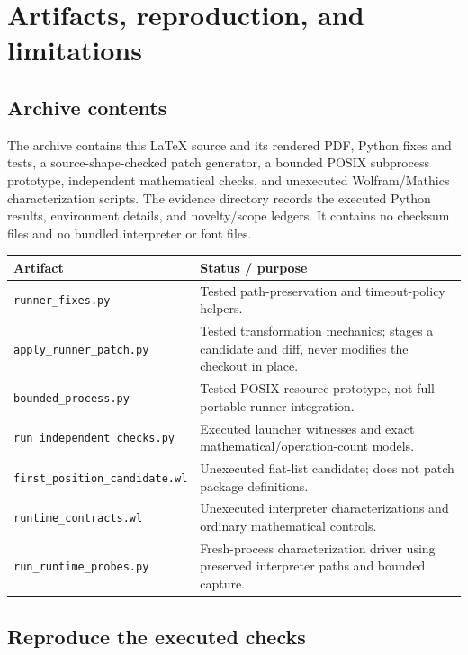 \documentclass[11pt,letterpaper]{article}
\newcommand{\file}[1]{\nolinkurl{#1}}
\begin{document}
\section{Artifacts, reproduction, and limitations}
\label{sec:artifacts}

\subsection{Archive contents}

The archive contains this LaTeX source and its rendered PDF, Python fixes and tests, a source-shape-checked patch generator, a bounded POSIX subprocess prototype, independent mathematical checks, and unexecuted Wolfram/Mathics characterization scripts. The evidence directory records the executed Python results, environment details, and novelty/scope ledgers. It contains no checksum files and no bundled interpreter or font files.

\begin{center}\small
\begin{tabularx}{\textwidth}{@{}P{2.5in}Y@{}}
\toprule
Artifact & Status / purpose \\
\midrule
\file{runner_fixes.py} & Tested path-preservation and timeout-policy helpers. \\
\file{apply_runner_patch.py} & Tested transformation mechanics; stages a candidate and diff, never modifies the checkout in place. \\
\file{bounded_process.py} & Tested POSIX resource prototype, not full portable-runner integration. \\
\file{run_independent_checks.py} & Executed launcher witnesses and exact mathematical/operation-count models. \\
\file{first_position_candidate.wl} & Unexecuted flat-list candidate; does not patch package definitions. \\
\file{runtime_contracts.wl} & Unexecuted interpreter characterizations and ordinary mathematical controls. \\
\file{run_runtime_probes.py} & Fresh-process characterization driver using preserved interpreter paths and bounded capture. \\
\bottomrule
\end{tabularx}
\end{center}

\subsection{Reproduce the executed checks}
\end{document}
